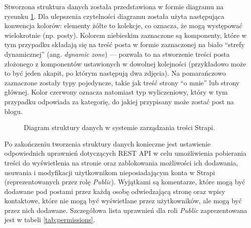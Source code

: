 \documentclass[12pt]{article}
\numberwithin{figure}{section}
\begin{document}
\begin{sloppypar}
Stworzona struktura danych została przedstawiona w formie diagramu na rysunku \ref{fig:diagram-typu-tresci.png}. Dla ulepszenia czytelności diagramu została użyta następująca konwencja kolorów: elementy żółte to kolekcje, co oznacza, że mogą występować wielokrotnie (np. posty). Kolorem niebieskim zaznaczone są komponenty, które w tym przypadku składają się na treść posta w formie zaznaczonej na biało ``strefy dynamicznej'' (ang. \textit{dynamic zone}) --- pozwala to na stworzenie treści posta złożonego z komponentów ustawionych w dowolnej kolejności (przykładowo może to być jeden akapit, po którym następują dwa zdjęcia). Na pomarańczowo zaznaczone zostały typy pojedyncze, takie jak treść strony ``o mnie'' lub strony głównej. Kolor czerwony oznacza natomiast typ wyliczeniowy, który w tym przypadku odpowiada za kategorię, do jakiej przypisany może zostać post na blogu.

\begin{figure}[H] 
    \centering
   \caption{Diagram struktury danych w systemie zarządzania treści Strapi.}
   \label{fig:diagram-typu-tresci.png}
\end{figure}

Po zakończeniu tworzenia struktury danych konieczne jest ustawienie odpowiednich uprawnień dotyczących REST API w celu umożliwienia pobierania treści do wyświetlenia na stronie oraz zablokowania możliwości ich dodawania, usuwania i modyfikacji użytkownikom nieposiadającym konta w Strapi (reprezentowanych przez rolę \textit{Public}). Wyjątkami są komentarze, które mogą być dodawane pod postami przez każdą osobę odwiedzającą stronę oraz wpisy kontaktowe, które nie mogą być wyświetlane przez użytkowników, ale mogą być przez nich dodawane. Szczegółowa lista uprawnień dla roli \textit{Public} zaprezentowana jest w tabeli \ref{tab:permissions}. 


\end{sloppypar}
\end{document}
